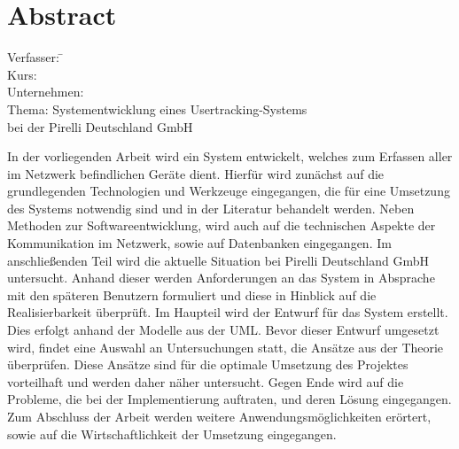 \section*{Abstract}
\label{sec:Abstract}

\begin{tabbing}
Verfasser:	 \hspace{20mm} \= \autor\\
Kurs:	  \>\kursbez\\
Unternehmen:	  \>\firmenname\\
Thema:	  \> Systementwicklung eines Usertracking-Systems\\
		\> bei der Pirelli Deutschland GmbH\\
\end{tabbing}

In der vorliegenden Arbeit wird ein System entwickelt, welches zum Erfassen aller im Netzwerk befindlichen Geräte dient.
Hierfür wird zunächst auf die grundlegenden Technologien und Werkzeuge eingegangen, die für eine Umsetzung des Systems notwendig sind und in der Literatur behandelt werden.
Neben Methoden zur Softwareentwicklung, wird auch auf die technischen Aspekte der Kommunikation im Netzwerk, sowie auf Datenbanken eingegangen.
Im anschließenden Teil wird die aktuelle Situation bei Pirelli Deutschland GmbH untersucht. Anhand dieser werden Anforderungen an das System in Absprache mit den späteren Benutzern formuliert und diese in Hinblick auf die Realisierbarkeit überprüft.
Im Haupteil wird der Entwurf für das System erstellt. Dies erfolgt anhand der Modelle aus der UML. Bevor dieser Entwurf umgesetzt wird, findet eine Auswahl an Untersuchungen statt, die Ansätze aus der Theorie überprüfen. Diese Ansätze sind für die optimale Umsetzung des Projektes vorteilhaft und werden daher näher untersucht.
Gegen Ende wird auf die Probleme, die bei der Implementierung auftraten, und deren Lösung eingegangen. 
Zum Abschluss der Arbeit werden weitere Anwendungsmöglichkeiten erörtert, sowie auf die Wirtschaftlichkeit der Umsetzung eingegangen.